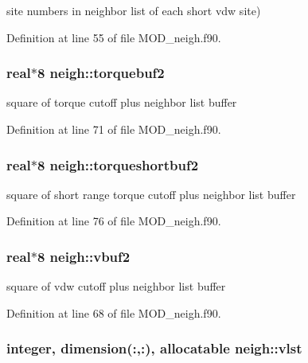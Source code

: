 site numbers in neighbor list of each short vdw site) 



Definition at line 55 of file M\-O\-D\-\_\-neigh.\-f90.

\hypertarget{classneigh_a6054edfe32412b415a10516845d2403e}{
\subsubsection[{torquebuf2}]{\setlength{\rightskip}{0pt plus 5cm}real$\ast$8 neigh\-::torquebuf2}}\label{classneigh_a6054edfe32412b415a10516845d2403e}


square of torque cutoff plus neighbor list buffer 



Definition at line 71 of file M\-O\-D\-\_\-neigh.\-f90.

\hypertarget{classneigh_abc30fecff32f4c08aa624fe00db9f4bb}{
\subsubsection[{torqueshortbuf2}]{\setlength{\rightskip}{0pt plus 5cm}real$\ast$8 neigh\-::torqueshortbuf2}}\label{classneigh_abc30fecff32f4c08aa624fe00db9f4bb}


square of short range torque cutoff plus neighbor list buffer 



Definition at line 76 of file M\-O\-D\-\_\-neigh.\-f90.

\hypertarget{classneigh_af1b5dc4cada84bd65f6b215bcbf8a344}{
\subsubsection[{vbuf2}]{\setlength{\rightskip}{0pt plus 5cm}real$\ast$8 neigh\-::vbuf2}}\label{classneigh_af1b5dc4cada84bd65f6b215bcbf8a344}


square of vdw cutoff plus neighbor list buffer 



Definition at line 68 of file M\-O\-D\-\_\-neigh.\-f90.

\hypertarget{classneigh_adecf1389089b0ed25f60e40cefba27fd}{
\subsubsection[{vlst}]{\setlength{\rightskip}{0pt plus 5cm}integer, dimension(\-:,\-:), allocatable neigh\-::vlst}}\label{classneigh_adecf1389089b0ed25f60e40cefba27fd}


